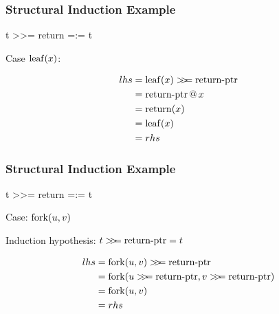 \documentclass[serif,professionalfont]{beamer}
\begin{document}
\begin{frame}[fragile]
\frametitle{Structural Induction Example}

\begin{code}
t >>= return =:= t
\end{code}

\vspace{2\baselineskip}

Case $\mathrm{leaf}(x)$:

\begin{align*}
lhs = & \; \mathrm{leaf}(x) >\!\!>\!\!= \mathrm{\operatorname{return-ptr}} \\
    = & \; \mathrm{\operatorname{return-ptr}} \, @ \, x         \\
    = & \; \mathrm{return}(x)                    \\
    = & \; \mathrm{leaf}(x)                      \\
    = & \; rhs
\end{align*}

\end{frame}

\begin{frame}[fragile]
\frametitle{Structural Induction Example}

\begin{code}
t >>= return =:= t
\end{code}

\vspace{2\baselineskip}

Case: $\mathrm{fork}(u,v)$

\vspace{1\baselineskip}

Induction hypothesis: $t >\!\!>\!\!= \mathrm{\operatorname{return-ptr}} = t$

\begin{align*}
lhs = & \; \bind{\fork{u}{v}}{\ptr{return}}                      \\
    = & \; \fork{\bind{u}{\ptr{return}}}{\bind{v}{\ptr{return}}} \\
    = & \; \fork{u}{v}                                           \\
    = & \; rhs
\end{align*}

\end{frame}
\end{document}
